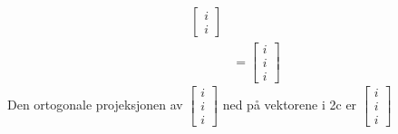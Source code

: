 \documentclass[11pt, a4paper, norsk]{NTNUoving}
\begin{document}
\begin{oppgave}
\begin{punkt}
\begin{align*}
\begin{bmatrix}
           i \\
           i
       \end{bmatrix}
       \\
       &= \begin{bmatrix}
           i \\
           i \\
           i
       \end{bmatrix}
       \end{align*}
       Den ortogonale projeksjonen av $\begin{bmatrix}
           i \\
           i \\
           i
       \end{bmatrix}$ ned på vektorene i 2c er $\begin{bmatrix}
           i \\
           i \\
           i
       \end{bmatrix}$
       \end{punkt}
   \end{oppgave}
    
\end{document}
